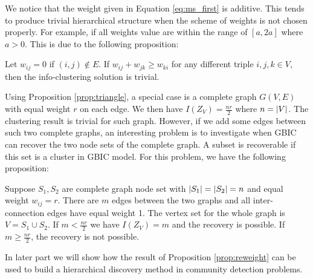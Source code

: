 We notice that the weight given in Equation \ref{eq:ms_first} is additive. This tends to produce trivial hierarchical structure when the scheme of weights is not chosen properly.
For example, if all weights value are within the range of $[a, 2a]$ where $a>0$. This is due to the following proposition:

\begin{proposition}\label{prop:triangle}
Let $w_{ij}=0$ if $(i,j)\not\in E$. If $w_{ij} + w_{jk} \geq w_{ki}$ for any different triple $i, j, k \in V$, then the info-clustering solution is trivial\footnotemark.
\end{proposition}

Using Proposition \ref{prop:triangle}, a special case is a complete graph $G(V,E)$ with equal weight $r$ on each edge. We then have $I(Z_{V})=\frac{nr}{2}$ where $n=\lvert V\rvert$. The clustering result is trivial for such graph. However, if we add some edges between such two complete graphs, an interesting problem is to investigate when GBIC can recover the two node sets of the complete graph. A subset is recoverable if this set is a cluster in GBIC model.
For this problem, we have the following proposition:

\begin{proposition}\label{prop:reweight}
Suppose $S_1, S_2 $ are complete graph node set with $\lvert S_1\rvert=\lvert S_2\rvert=n$ and equal weight $w_{ij}=r$. There are $m$ edges between the two graphs and all inter-connection edges have equal weight 1. The vertex set for the whole graph is $V=S_1\cup S_2$. If $m <\frac{nr}{2}$  we have
$I(Z_V) = 
m$ and the recovery is possible. If $m\geq \frac{nr}{2}$, the recovery is not possible.
\end{proposition}

In later part we will show how the result of Proposition \ref{prop:reweight} can be used to build a hierarchical discovery method in community detection problems.

